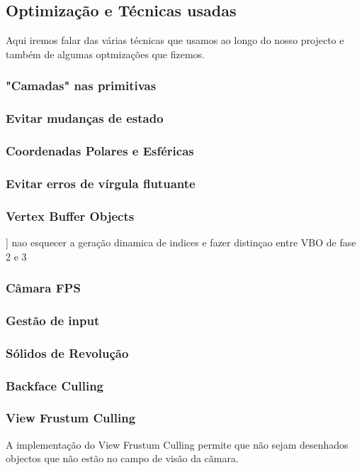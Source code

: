 \documentclass[a5paper,onecolumn, 11pt]{article}
\begin{document}
\newpage
\subsection{Optimização e Técnicas usadas}
Aqui iremos falar das várias técnicas que usamos ao longo do nosso projecto e também de algumas optmizações que fizemos.
\subsubsection{"Camadas" nas primitivas} \label{Camadas nas primitivas}
\subsubsection{Evitar mudanças de estado} \label{evitar mudancas de estado}
\subsubsection{Coordenadas Polares e Esféricas} \label{CoordenadasPolaresEEsfericas}
\subsubsection{Evitar erros de vírgula flutuante} \label{Erros de virgula flutuante}
\subsubsection{Vertex Buffer Objects} \label{VBO}]
nao esquecer a geração dinamica de indices e fazer distinçao entre VBO de fase 2 e 3
\subsubsection{Câmara FPS} \label{camara fps}
\subsubsection{Gestão de input} \label{Gestao de input}
\subsubsection{Sólidos de Revolução} \label{SolidosRevolucao}
\subsubsection{Backface Culling} \label{backfaceCulling}
\subsubsection{View Frustum Culling} \label{view frustum culling}
A implementação do View Frustum Culling permite que não sejam desenhados objectos que não estão no campo de visão da cãmara.
\end{document}
